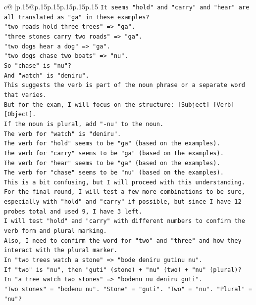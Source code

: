 \documentclass{article}
\begin{document}
{\begin{supertabular}{c@{$\;$}|p{.15\linewidth}@{}p{.15\linewidth}p{.15\linewidth}p{.15\linewidth}p{.15\linewidth}p{.15\linewidth}}
{{{\texttt{It seems "hold" and "carry" and "hear" are all translated as "ga" in these examples?} \\
\texttt{"two roads hold three trees" => "ga".} \\
\texttt{"three stones carry two roads" => "ga".} \\
\texttt{"two dogs hear a dog" => "ga".} \\
\texttt{"two dogs chase two boats" => "nu".} \\
\texttt{So "chase" is "nu"?} \\
\texttt{And "watch" is "deniru".} \\
\texttt{This suggests the verb is part of the noun phrase or a separate word that varies.} \\
\texttt{But for the exam, I will focus on the structure: {[}Subject{]} {[}Verb{]} {[}Object{]}.} \\
\texttt{If the noun is plural, add "{-}nu" to the noun.} \\
\texttt{The verb for "watch" is "deniru".} \\
\texttt{The verb for "hold" seems to be "ga" (based on the examples).} \\
\texttt{The verb for "carry" seems to be "ga" (based on the examples).} \\
\texttt{The verb for "hear" seems to be "ga" (based on the examples).} \\
\texttt{The verb for "chase" seems to be "nu" (based on the examples).} \\
\texttt{This is a bit confusing, but I will proceed with this understanding.} \\
\texttt{For the final round, I will test a few more combinations to be sure, especially with "hold" and "carry" if possible, but since I have 12 probes total and used 9, I have 3 left.} \\
\texttt{I will test "hold" and "carry" with different numbers to confirm the verb form and plural marking.} \\
\texttt{Also, I need to confirm the word for "two" and "three" and how they interact with the plural marker.} \\
\texttt{In "two trees watch a stone" => "bode deniru gutinu nu".} \\
\texttt{If "two" is "nu", then "guti" (stone) + "nu" (two) + "nu" (plural)?} \\
\texttt{In "a tree watch two stones" => "bodenu nu deniru guti".} \\
\texttt{"Two stones" = "bodenu nu". "Stone" = "guti". "Two" = "nu". "Plural" = "nu"?} \\
}}}
\end{supertabular}}
\end{document}
